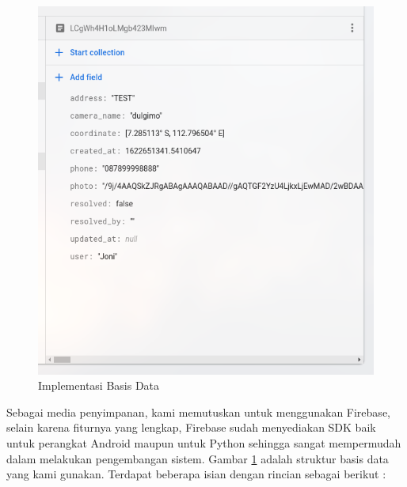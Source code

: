 \begin{figure} [!ht]
  \centering
  \includegraphics[width=.9\textwidth]{gambar/firestore.png}
  \caption{Implementasi Basis Data}

  \label{fig:db_impl}
\end{figure}

Sebagai media penyimpanan, kami memutuskan untuk menggunakan Firebase, selain karena fiturnya yang lengkap, Firebase sudah menyediakan SDK baik untuk perangkat Android maupun untuk Python sehingga sangat mempermudah dalam melakukan pengembangan sistem. Gambar \ref{fig:db_impl} adalah struktur basis data yang kami gunakan. Terdapat beberapa isian dengan rincian sebagai berikut :

